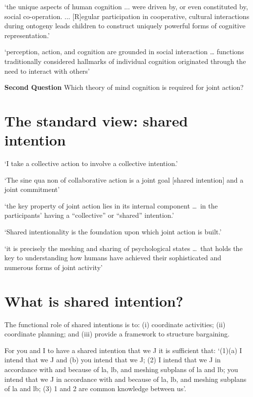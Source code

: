 \documentclass[11pt]{extarticle}
\begin{document}
\begin{multicols}{3}
`the unique aspects of human cognition ... were driven by, or even constituted by, social co-operation. ...
[R]egular participation in cooperative, cultural interactions during ontogeny leads children to construct uniquely powerful forms of cognitive representation.'
\citep%
{Moll:2007gu}


`perception, action, and cognition are grounded in social interaction
 … functions traditionally considered hallmarks of individual cognition originated through the need to interact with others' \citep%
{Knoblich:2006bn}





{\Large
\textbf{Second Question}
Which theory of mind cognition is required for joint action?
}



\section{The standard view: shared intention}

`I take a collective action to involve a collective intention.'  \citep%
{Gilbert:2006wr}

`The sine qua non of collaborative action is a joint goal [shared intention] and a joint commitment’ 
\citep%
{tomasello:2008origins}

`the key property of joint action lies in its internal component \ldots \ in the participants’ having a ``collective'' or ``shared'' intention.' \citep%
{alonso_shared_2009}

`Shared intentionality is the foundation upon which joint action is built.' \citep%
{Carpenter:2009wq}

`it is precisely the meshing and sharing of psychological states \ldots \ that holds the key to understanding how humans have achieved their sophisticated and numerous forms of joint activity'
\citep%
{Call:2009fk}



\section{What is shared intention?}

The functional role of shared intentions is to: 
(i) coordinate activities; (ii) coordinate planning; and (iii) provide a framework to structure bargaining.\citep%
{Bratman:1993je}

For you and I to have a shared intention that we J it is sufficient that: `(1)(a) I intend that we J and (b) you intend that we J; (2) I intend that we J in accordance with and because of la, lb, and meshing subplans of la and lb; you intend that we J in accordance with and because of la, lb, and meshing subplans of la and lb; (3) 1 and 2 are common knowledge between us'.\citep%
{Bratman:1993je}



\end{multicols}
\end{document}
